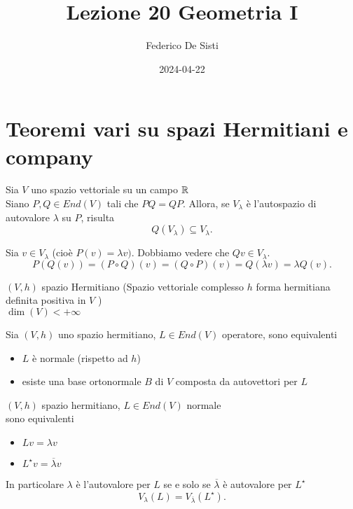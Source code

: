 \documentclass[12px]{article}
\title{Lezione 20 Geometria I}
\date{2024-04-22}
\author{Federico De Sisti}
\begin{document}
	\maketitle
	\newpage
	\section{Teoremi vari su spazi Hermitiani e company}
	\begin{lemm}
		Sia $V$ uno spazio vettoriale su un campo $\mathbb{R}$\\
		Siano  $P,Q\in End(V)$ tali che $PQ=QP$. Allora, se  $V_\lambda$ è l'autospazio di autovalore $\lambda$ su $P$, risulta
		\[
		Q(V_\lambda)\subseteq V_\lambda
		.\] 
	\end{lemm}
	\begin{dimo}
		Sia $v\in V_ \lambda $ (cioè $P(v) = \lambda v)$. Dobbiamo vedere che $Qv\in V_ \lambda$.
		\[
		P(Q(v)) = (P\circ Q)(v) = (Q\circ P)(v) = Q( \lambda v) = \lambda Q(v)
		.\]
	\end{dimo}
	$(V,h)$ spazio Hermitiano (Spazio vettoriale complesso $h$ forma hermitiana definita positiva in $V$ )\\
	$\dim(V) < +\infty$
	 \begin{teo}
		Sia $(V,h)$ uno spazio hermitiano, $L\in End(V)$ operatore, sono equivalenti
		\begin{itemize}
			\item $L$ è normale (rispetto ad $h$)
			\item esiste una base ortonormale $B$ di  $V$ composta da autovettori per $L$
		\end{itemize}
	\end{teo}
	\begin{lemm}
		$(V,h)$ spazio hermitiano, $L\in End(V)$ normale\\
		sono equivalenti
		\begin{itemize}
			\item $Lv = \lambda v$
			\item  $L^\star v = \overline{ \lambda} v$
		\end{itemize}
		In particolare $ \lambda$ è l'autovalore per $L$ se e solo se $\overline{ \lambda}$ è autovalore per $ L^\star$ 
		\[
			V_ \lambda (L) = V_{\overline{ \lambda}}(L^\star)
		.\] 
	\end{lemm}
\end{document}
